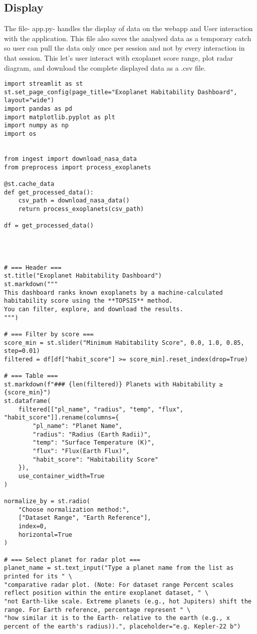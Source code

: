 \documentclass[12pt]{article}
\begin{document}
\subsection{Display}\label{subsec:Output}
The file- app.py- handles the display of data on the webapp and User interaction with the application. This file also saves the analysed data as a temporary catch so user can pull the data only once per session and not by every interaction in that session. This let's user interact with exoplanet score range, plot radar diagram, and download the complete displayed data as a .csv file.
\begin{verbatim}
import streamlit as st
st.set_page_config(page_title="Exoplanet Habitability Dashboard", layout="wide")
import pandas as pd
import matplotlib.pyplot as plt
import numpy as np
import os


from ingest import download_nasa_data
from preprocess import process_exoplanets

@st.cache_data
def get_processed_data():
    csv_path = download_nasa_data()
    return process_exoplanets(csv_path)

df = get_processed_data()




# === Header ===
st.title("Exoplanet Habitability Dashboard")
st.markdown("""
This dashboard ranks known exoplanets by a machine-calculated habitability score using the **TOPSIS** method.
You can filter, explore, and download the results.
""")

# === Filter by score ===
score_min = st.slider("Minimum Habitability Score", 0.0, 1.0, 0.85, step=0.01)
filtered = df[df["habit_score"] >= score_min].reset_index(drop=True)

# === Table ===
st.markdown(f"### {len(filtered)} Planets with Habitability ≥ {score_min}")
st.dataframe(
    filtered[["pl_name", "radius", "temp", "flux", "habit_score"]].rename(columns={
        "pl_name": "Planet Name",
        "radius": "Radius (Earth Radii)",
        "temp": "Surface Temperature (K)",
        "flux": "Flux(Earth Flux)",
        "habit_score": "Habitability Score"
    }),
    use_container_width=True
)

normalize_by = st.radio(
    "Choose normalization method:",
    ["Dataset Range", "Earth Reference"],
    index=0,
    horizontal=True
)

# === Select planet for radar plot ===
planet_name = st.text_input("Type a planet name from the list as printed for its " \
"comparative radar plot. (Note: For dataset range Percent scales reflect position within the entire exoplanet dataset, " \
"not Earth-like scale. Extreme planets (e.g., hot Jupiters) shift the range. For Earth reference, percentage represent " \
"how similar it is to the Earth- relative to the earth (e.g., x percent of the earth's radius)).", placeholder="e.g. Kepler-22 b")


\end{verbatim}
\end{document}

